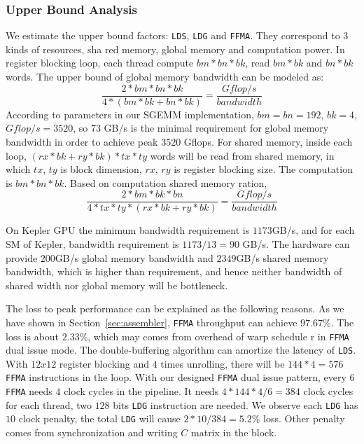 \subsubsection{Upper Bound Analysis}


We estimate the upper bound factors: {\tt LDS}, {\tt LDG} and {\tt FFMA}. They correspond to $3$ kinds of resources, sha
red
memory, global memory and computation power. In register blocking loop, each thread compute $bm*bn*bk$, read $bm*bk$
and $bn*bk$ words. The upper bound of global memory bandwidth can be modeled as:
\begin{displaymath}
    \frac{2*bm*bn*bk}{4*(bm*bk + bn*bk)} = \frac{Gflop/s}{bandwidth}
\end{displaymath}
According to parameters in our SGEMM implementation, $bm=bn=192$, $bk=4$, $Gflop/s=3520$, so $73$ GB/s is the minimal
requirement for global memory bandwidth in order to achieve peak $3520$ Gflops.
For shared memory, inside each loop, $(rx*bk + ry * bk)*tx*ty$ words will be read from shared memory, in which $tx$,
$ty$ is block dimension, $rx$, $ry$ is register blocking size. The computation is $bm*bn*bk$. Based on computation
shared memory ration,
\begin{displaymath}
    \frac{2*bm*bk*bn}{4*tx*ty*(rx*bk + ry *bk)}  = \frac{Gflop/s}{bandwidth}
\end{displaymath}

On Kepler GPU the minimum bandwidth requirement is $1173$GB/s, and for each SM of Kepler, bandwidth requirement is
$1173/13=90$ GB/s.
The hardware can provide $200$GB/s global memory bandwidth and $2349$GB/s shared memory bandwidth, which is
higher than requirement, and hence neither bandwidth of shared width nor global memory will be bottleneck.

The loss to peak performance can be explained as the following reasons. As we have shown in Section~\ref{sec:assembler},
 {\tt FFMA} throughput can achieve $97.67\%$. The loss is about $2.33\%$, which may comes from overhead of warp schedule
r in {\tt FFMA} dual issue mode. The double-buffering algorithm can amortize the latency of {\tt LDS}.
With $12x12$ register blocking and $4$ times unrolling, there will be $144*4=576$ {\tt FFMA} instructions in the loop.
With our designed {\tt FFMA} dual issue pattern, every $6$ {\tt FFMA} needs $4$ clock cycles in the pipeline.
It needs $4*144*4/6=384$ clock cycles for each thread,  two $128$ bits {\tt LDG} instruction are needed.
We observe each {\tt LDG} has $10$ clock penalty, the total {\tt LDG} will cause $2*10/384 = 5.2\%$ loss. Other penalty 
comes from synchronization and writing $C$ matrix in the block.
